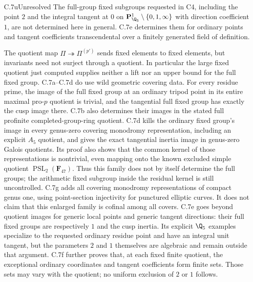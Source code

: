 \begin{claim}{C.7u}{Unresolved}
The full-group fixed subgroups requested in C4, including the point $2$
and the integral tangent at $0$ on
$\mathbf P^1_{\Q_5}\setminus\{0,1,\infty\}$ with direction coefficient
$1$, are not determined here in general. C.7e determines them for
ordinary points and tangent coefficients transcendental over a
finitely generated field of definition.
\end{claim}
The quotient map
$\Pi\twoheadrightarrow\Pi^{(p')}$ sends fixed elements to fixed elements,
but invariants need not surject through a quotient. In particular the large
fixed quotient just computed supplies neither a lift nor an upper bound
for the full fixed group. C.7a--C.7d do use wild geometric covering data. For every residue prime,
the image of the full fixed group at an ordinary tripod point in its
entire maximal pro-$p$ quotient is trivial, and the tangential full fixed
group has exactly the cusp image there. C.7b also determines their images
in the stated full profinite completed-group-ring quotient. C.7d kills
the ordinary fixed group's image in every genus-zero covering
monodromy representation, including an explicit $A_5$ quotient, and
gives the exact tangential inertia image in genus-zero Galois quotients.
Its proof also shows that the common kernel of those representations
is nontrivial, even mapping onto the known excluded simple quotient
$\operatorname{PSL}_2(\mathbf F_{47})$. Thus this family does not by
itself determine the full groups; the arithmetic fixed subgroup
inside the residual kernel is still uncontrolled. C.7g adds all
covering monodromy representations of compact genus one, using
point-section injectivity for punctured elliptic curves. It does
not claim that this enlarged family is cofinal among all covers.
C.7e goes beyond quotient images for generic local points and
generic tangent directions: their full fixed groups are respectively
$1$ and the cusp inertia. Its explicit $\Q_5$ examples specialize
to the requested ordinary residue point and have an integral unit
tangent, but the parameters $2$ and $1$ themselves are algebraic and
remain outside that argument. C.7f further proves that, at each fixed
finite quotient, the exceptional ordinary coordinates and tangent
coefficients form finite sets. Those sets may vary with the quotient;
no uniform exclusion of $2$ or $1$ follows.

